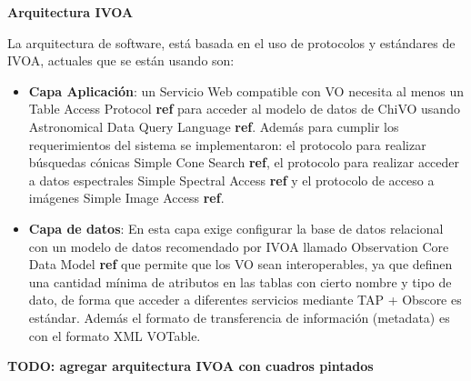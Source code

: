 \textbf{Arquitectura IVOA}

La arquitectura de software, está basada en el uso de protocolos y estándares de IVOA, actuales que se están usando son:
\begin{itemize}
 \item \textbf{Capa Aplicación}: un Servicio Web compatible con VO necesita al menos un Table Access Protocol \textbf{ref} para acceder al modelo de datos de ChiVO usando Astronomical Data Query Language \textbf{ref}. Además para cumplir los requerimientos del sistema se implementaron: el protocolo para realizar búsquedas cónicas Simple Cone Search \textbf{ref}, el protocolo para realizar acceder a datos espectrales Simple Spectral Access \textbf{ref} y el protocolo de acceso a imágenes Simple Image Access \textbf{ref}.
  \item \textbf{Capa de datos}: En esta capa exige configurar la base de datos relacional con un modelo de datos recomendado por IVOA llamado Observation Core Data Model \textbf{ref} que permite que los VO sean interoperables, ya que definen una cantidad mínima de atributos en las tablas con cierto nombre y tipo de dato, de forma que acceder a diferentes servicios mediante TAP + Obscore es estándar. Además el formato de transferencia de información (metadata) es con el formato XML VOTable.
\end{itemize}

\textbf{TODO: agregar arquitectura IVOA con cuadros pintados}

